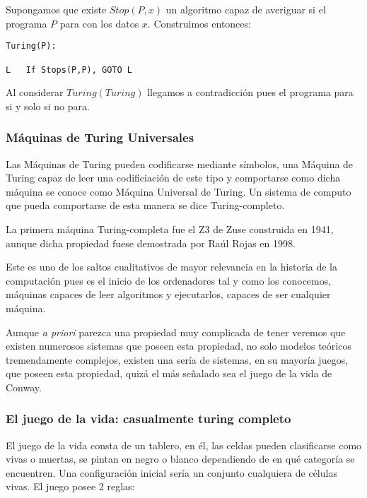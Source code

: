 Supongamos que existe $Stop(P,x)$ un algoritmo capaz de averiguar si el programa $P$ para con los datos $x$. Construimos entonces:

\begin{lstlisting}
Turing(P):

L	If Stops(P,P), GOTO L
\end{lstlisting}

\vspace{0.5cm}

Al considerar $Turing(Turing)$ llegamos a contradicción pues el programa para si y solo si no para.

\subsubsection{Máquinas de Turing Universales}

Las Máquinas de Turing pueden codificarse mediante símbolos, una Máquina de Turing capaz de leer una codificiación de este tipo y comportarse como dicha máquina se conoce como Máquina Universal de Turing. Un sistema de computo que pueda comportarse de esta manera se dice Turing-completo.

La primera máquina Turing-completa fue el Z3 de Zuse construida en 1941, aunque dicha propiedad fuese demostrada por Raúl Rojas en 1998.

Este es uno de los saltos cualitativos de mayor relevancia en la historia de la computación pues es el inicio de los ordenadores tal y como los conocemos, máquinas capaces de leer algoritmos y ejecutarlos, capaces de ser cualquier máquina.

Aunque \textit{a priori} parezca una propiedad muy complicada de tener veremos que existen numerosos sistemas que poseen esta propiedad, no solo modelos teóricos tremendamente complejos, existen una sería de sistemas, en su mayoría juegos, que poseen esta propiedad, quizá el más señalado sea el juego de la vida de Conway.



\subsubsection{El juego de la vida: casualmente turing completo}

El juego de la vida consta de un tablero, en él, las celdas pueden clasificarse como vivas o muertas, se pintan en negro o blanco dependiendo de en qué categoría se encuentren. Una configuración inicial sería un conjunto cualquiera de células vivas. El juego posee 2 reglas:

